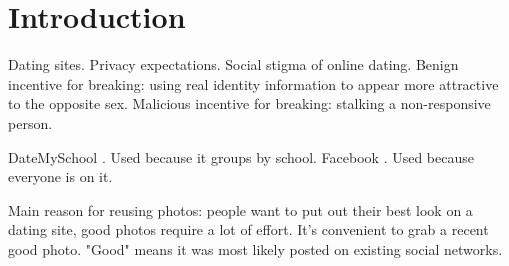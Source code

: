 \section{Introduction}
\label{sec:intro}

Dating sites. Privacy expectations. Social stigma of online dating. Benign
incentive for breaking: using real identity information to appear more
attractive to the opposite sex. Malicious incentive for breaking: stalking a
non-responsive person.

DateMySchool \cite{dms2014}. Used because it groups by school. Facebook
\cite{fb2014}. Used because everyone is on it.

Main reason for reusing photos: people want to put out their best look on a
dating site, good photos require a lot of effort. It's convenient to grab a
recent good photo. "Good" means it was most likely posted on existing social
networks.
